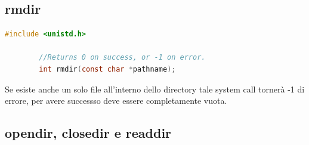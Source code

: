 \documentclass[a4paper, 12pt]{book}
\begin{document}
    \subsection{rmdir}

    \begin{lstlisting}[language=C]
        #include <unistd.h>

        //Returns 0 on success, or -1 on error.
        int rmdir(const char *pathname);
    \end{lstlisting}
    Se esiste anche un solo file all'interno dello directory
    tale system call tornerà -1 di errore, per avere successso
    deve essere completamente vuota.

    \subsection{opendir, closedir e readdir}
\end{document}
